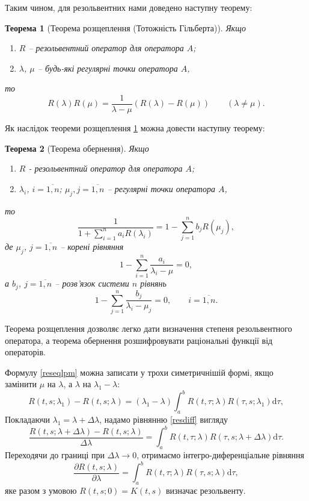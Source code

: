 \documentclass[14pt,twoside]{extreport}
\theoremstyle{mystyle}
\newtheorem{thm}{Теорема}
\numberwithin{equation}{chapter}
\begin{document}
Таким чином, для резольвентних нами доведено наступну теорему:
\begin{thm}[Теорема розщеплення (Тотожність Гільберта)]\label{clvgthm}
Якщо
\begin{enumerate}
\item $R$ -- резольвентний оператор для оператора $A$; \item
$\lambda$, $\mu$ -- будь-які регулярні точки оператора $A$,
\end{enumerate}
то
\begin{equation*}
R(\lambda )R(\mu ) = \frac{1} {\lambda  - \mu }\left( {R
(\lambda ) - R (\mu )} \right) \qquad (\lambda \ne \mu ).
\end{equation*}
\end{thm}
Як наслідок теореми розщеплення \ref{clvgthm} можна довести наступну
теорему:
\begin{thm}[Теорема обернення]
Якщо
\begin{enumerate}
\item $R$ - резольвентний оператор для оператора $A$; \item
$\lambda _i$, $i = \overline {1,n}$; $\mu _j ,j = \overline {1,n}$ --
регулярні точки оператора $A$,
\end{enumerate}
то
\begin{equation*}
\frac{1} {{1 + \sum\limits_{i = 1}^n {a_i R(\lambda _i )} }} =
1 - \sum\limits_{j = 1}^n {b_j R(\mu _j )},
\end{equation*}
де $\mu_j$, $j = \overline {1,n}$ --
корені рівняння
\begin{equation*}
1 - \sum\limits_{i = 1}^n {\frac{{a_i }} {{\lambda _i  - \mu }} =
0},
\end{equation*}
а $b_j$, $j = \overline{1,n}$ -- розв'язок системи $n$ рівнянь
\begin{equation*}
1 - \sum\limits_{j = 1}^n {\frac{{b_j }} {{\lambda _i  - \mu _j }}
= 0,}\qquad i = \overline {1,n}.
\end{equation*}
\end{thm}
Теорема розщеплення дозволяє легко дати визначення степеня
резольвентного оператора, а теорема обернення розшифровувати
раціональні функції від операторів.

Формулу \eqref{reseqlpm} можна записати у трохи симетричнішій формі, якщо замінити $\mu$ на $\lambda$, а $\lambda$ на $\lambda_1-\lambda$:
\begin{equation}\label{resdiff}
 R(t, s; \lambda_1) - R(t, s; \lambda) = (\lambda_1 - \lambda) \int_{a}^{b} R(t, \tau; \lambda) R(\tau, s; \lambda_1) \mathrm{d}\tau,
\end{equation}
Покладаючи $\lambda_1 = \lambda + \Delta\lambda$, надамо рівнянню \eqref{resdiff} вигляду
\[
 \dfrac{R(t, s; \lambda+\Delta\lambda) - R(t, s; \lambda)}{\Delta\lambda} = \int_{a}^{b} R(t, \tau; \lambda) R(\tau, s; \lambda + \Delta\lambda) \mathrm{d}\tau.
\]
Переходячи до границі при $\Delta\lambda \to 0$, отримаємо інтегро-диференціальне рівняння
\begin{equation}
 \dfrac{\partial R(t, s; \lambda)}{\partial\lambda} = \int_{a}^{b} R(t, \tau; \lambda) R(\tau, s; \lambda) \mathrm{d}\tau,
\end{equation}
яке разом з умовою $R (t, s; 0) = K(t, s)$ визначає резольвенту.
\end{document}
